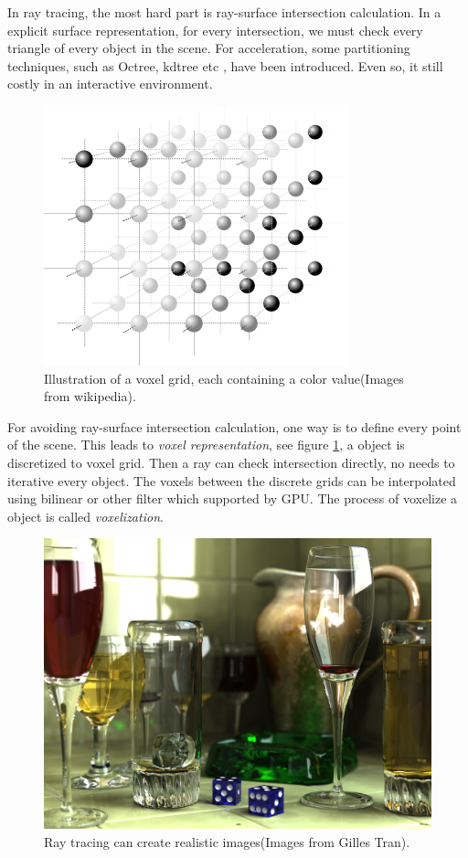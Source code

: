 In ray tracing, the most hard part is ray-surface intersection calculation. In a explicit surface representation, for every intersection, we must check every triangle of every object in the scene. For acceleration, some partitioning techniques, such as Octree, kdtree etc , have been introduced. Even so, it still costly in an interactive environment.

\begin{figure}
\sidecaption
	\includegraphics[width=.65\textwidth]{graphics/df/Voxelgitter}
	\caption{Illustration of a voxel grid, each containing a color value(Images from wikipedia).}
	\label{f:volume-representation}
\end{figure}

For avoiding ray-surface intersection calculation, one way is to define every point of the scene. This leads to \textit{voxel representation}, see figure \ref{f:volume-representation}, a object is discretized to voxel grid. Then a ray can check intersection directly, no needs to iterative every object. The voxels between the discrete grids can be interpolated using bilinear or other filter which supported by GPU. The process of voxelize a object is called \textit{voxelization}.

\begin{figure}
	\includegraphics[width=1.0\textwidth]{graphics/df/ray-tracing-result}
	\caption{Ray tracing can create realistic images(Images from Gilles Tran).}
	\label{f:ray-tracing-result}
\end{figure}

